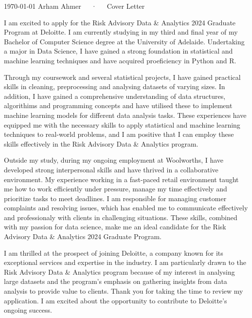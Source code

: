 \documentclass[11pt, a4paper]{awesome-cv}
\begin{document}
\makecvheader[L]

\makecvfooter
  {\today}
  {Arham Ahmer~~~·~~~Cover Letter}
  {}

\makelettertitle

\begin{cvletter}

I am excited to apply for the Risk Advisory Data \& Analytics 2024 Graduate Program at Deloitte. I am currently studying in my third and final year of my Bachelor of Computer Science degree at the University of Adelaide. Undertaking a major in Data Science, I have gained a strong foundation in statistical and machine learning techniques and have acquired proeficiency in Python and R.

Through my coursework and several statistical projects, I have gained practical skills in cleaning, preprocessing and analysing datasets of varying sizes. In addition,  I have gained a comprehensive understanding of data structures, algorithims and programming concepts and have utilised these to implement machine learning models for different data analysis tasks. These experiences have equipped me with the necessary skills to apply statistical and machine learning techniques to real-world problems, and I am positive that I can employ these skills effectively in the Risk Advisory Data \& Analytics program.
  
Outside my study, during my ongoing employment at Woolworths, I have developed strong interpersonal skills and have thrived in a collaborative environment. My experience working in a fast-paced retail environment taught me how to work efficiently under pressure, manage my time effectively and prioritize tasks to meet deadlines. I am responsible for managing customer complaints and resolving issues, which has enabled me to communicate effectively and professionaly with clients in challenging situations. These skills, combined with my passion for data science, make me an ideal candidate for the Risk Advisory Data \& Analytics 2024 Graduate Program. 
  
I am thrilled at the prospect of joining Deloitte, a company known for its exceptional services and expertise in the industry. I am particularly drawn to the Risk Advisory Data \& Analytics program because of my interest in analysing large datasets and the program's emphasis on gathering insights from data analysis to provide value to clients. Thank you for taking the time to review my application. I am excited about the opportunity to contribute to Deloitte's ongoing success. 


\end{cvletter}


\makeletterclosing
\end{document}
